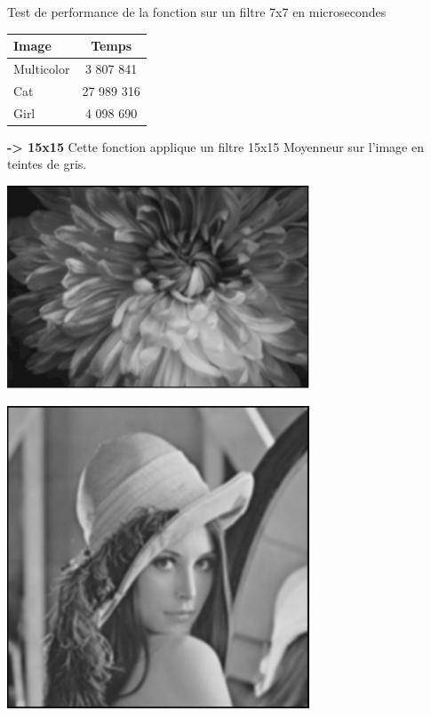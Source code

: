 \documentclass{article}
\begin{document}
\begin{center}
\medbreak
Test de performance de la fonction sur un filtre 7x7 en microsecondes
\bigbreak
   \begin{tabular}{ | l | c | }
     \hline
     Image & Temps \\
     \hline
     Multicolor & 3 807 841 \\
     \hline
     Cat & 27 989 316 \\
     \hline
     Girl & 4 098 690 \\
     \hline
   \end{tabular}
 \end{center}
\bigbreak

\textbf{-> 15x15}
Cette fonction applique un filtre 15x15 Moyenneur sur l'image en teintes de gris.

\begin{center} 
    \includegraphics[width=9cm]{../Image_fonctions/Multicolor/Average15.PNG}
\end{center}
\begin{center} 
    \includegraphics[width=9cm]{../Image_fonctions/Lenna/Average15.PNG}
\end{center}
\end{document}
